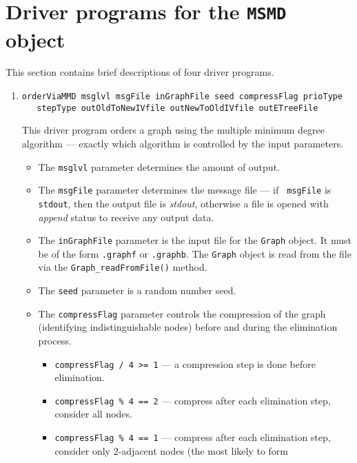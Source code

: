\par
\section{Driver programs for the {\tt MSMD} object}
\label{section:MSMD:drivers}
\par
This section contains brief descriptions of four driver programs.
\par
\begin{enumerate}
\item
\begin{verbatim}
orderViaMMD msglvl msgFile inGraphFile seed compressFlag prioType 
   stepType outOldToNewIVfile outNewToOldIVfile outETreeFile 
\end{verbatim}
This driver program orders a graph using the multiple minimum
degree algorithm --- exactly which algorithm is controlled by the
input parameters.
\par
\begin{itemize}
\item
The {\tt msglvl} parameter determines the amount of output.
\item
The {\tt msgFile} parameter determines the message file --- if {\tt
msgFile} is {\tt stdout}, then the output file is {\it stdout},
otherwise a file is opened with {\it append} status to receive any
output data.
\item
The {\tt inGraphFile} parameter is the input file for the {\tt Graph}
object. It must be of the form {\tt *.graphf} or {\tt *.graphb}.
The {\tt Graph} object is read from the file via the
{\tt Graph\_readFromFile()} method.
\item
The {\tt seed} parameter is a random number seed.
\item
The {\tt compressFlag} parameter controls the compression of the
graph (identifying indistinguishable nodes) 
before and during the elimination process.
\begin{itemize}
\item 
{\tt compressFlag / 4 >= 1} --- a compression step is done
before elimination.
\item 
{\tt compressFlag \% 4 == 2} --- compress after each elimination step,
consider all nodes.
\item 
{\tt compressFlag \% 4 == 1} --- compress after each elimination step,
consider only 2-adjacent nodes (the most likely to form

\end{itemize}
\end{itemize}
\end{enumerate}

